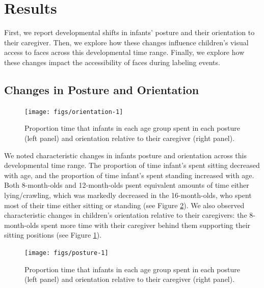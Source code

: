 \documentclass[10pt, letterpaper]{article}
\newenvironment{CodeChunk}{}{}
\begin{document}
\section{Results}\label{results}

First, we report developmental shifts in infants' posture and their
orientation to their caregiver. Then, we explore how these changes
influence children's visual access to faces across this developmental
time range. Finally, we explore how these changes impact the
accessibility of faces during labeling events.

\subsection{Changes in Posture and
Orientation}\label{changes-in-posture-and-orientation}

\begin{CodeChunk}
\begin{figure}[h]

{\centering \texttt{[image: figs/orientation-1]} 

}

\caption[Proportion time that infants in each age group spent in each posture (left panel) and orientation relative to their caregiver (right  panel)]{Proportion time that infants in each age group spent in each posture (left panel) and orientation relative to their caregiver (right  panel).}\label{fig:orientation}
\end{figure}
\end{CodeChunk}

We noted characteristic changes in infants posture and orientation
across this developmental time range. The proportion of time infant's
spent sitting decreased with age, and the proportion of time infant's
spent standing increased with age. Both 8-month-olds and 12-month-olds
psent equivalent amounts of time either lying/crawling, which was
markedly decreased in the 16-month-olds, who spent most of their time
either sitting or standing (see Figure \ref{fig:posture}). We also
observed characteristic changes in children's orientation relative to
their caregivers: the 8-month-olds spent more time with their caregiver
behind them supporting their sitting positions (see Figure
\ref{fig:orientation}).

\begin{CodeChunk}
\begin{figure}[h]

{\centering \texttt{[image: figs/posture-1]} 

}

\caption[Proportion time that infants in each age group spent in each posture (left panel) and orientation relative to their caregiver (right  panel)]{Proportion time that infants in each age group spent in each posture (left panel) and orientation relative to their caregiver (right  panel).}\label{fig:posture}
\end{figure}
\end{CodeChunk}
\end{document}
